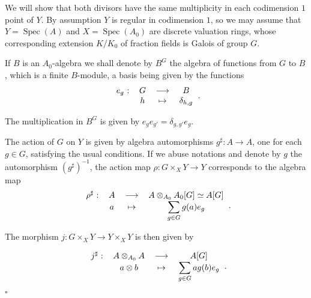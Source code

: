 \documentclass{amsart}
\newenvironment{demo}{{\flushleft \bf Proof~:}}{\hfill $\square$ \vspace{5mm}}
\theoremstyle{definition}
\theoremstyle{remark}
\begin{document}
\begin{demo}

We will show that both divisors have the same multiplicity in each codimension $1$ point of $Y$. By assumption $Y$ is regular in codimension $1$, so we may assume that $Y=\operatorname{Spec}(A)$ and $X=\operatorname{Spec}(A_0)$ are discrete valuation rings, whose corresponding extension $K/K_0$ of fraction fields is Galois of group $G$.

If $B$ is an $A_0$-algebra we shall denote by $B^G$ the algebra of functions from $G$ to $B$, which is a finite $B$-module, a basis being given by the functions  \[ \begin{tabular}{cccc}

$e_g$ :  & $G$ & ${\longrightarrow}$ & $B$ \\ 

 & $h$ & $\mapsto$ & $\delta_{h,g}$ \\ 

\end{tabular}. \]

The multiplication in $B^G$ is given by $e_g e_{g'} = \delta_{g,g'}e_g$.

The action of $G$ on $Y$ is given by algebra automorphisms $g^\sharp : A {\longrightarrow} A$, one for each $g \in G$, satisfying the usual conditions. If we abuse notations and denote by $g$ the automorphism $(g^\sharp)^{-1}$, the action map $\rho : G \times_X Y {\longrightarrow} Y$ corresponds to the algebra map 
  \[ \begin{tabular}{cccc}
 
$\rho^\sharp$ :  & $A$ & ${\longrightarrow}$ & $A \otimes_{A_0} A_0[G] \simeq A[G]$ \\ 
 
 & $a$ & $\mapsto$ & $\displaystyle\sum_{g \in G} g(a)e_g$ \\ 
 
\end{tabular}. \]

The morphism $j : G \times_X Y {\longrightarrow} Y \times_X Y$ is then given by 

\[ \begin{tabular}{cccc}

$j^\sharp$ :  & $A \otimes_{A_0} A$ & ${\longrightarrow}$ & $A[G]$ \\ 

 & $a \otimes b $ & $\mapsto$ & $\displaystyle\sum_{g \in G} ag(b) e_g$ \\ 

\end{tabular}. \]


\end{demo}
\end{document}
